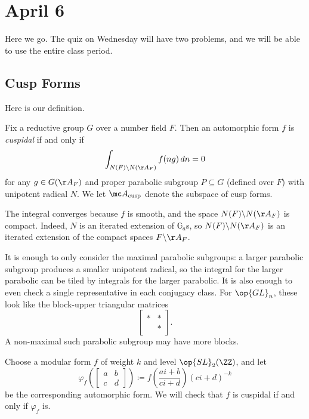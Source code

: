 \documentclass[../notes.tex]{subfiles}
\begin{document}
\section{April 6}
Here we go. The quiz on Wednesday will have two problems, and we will be able to use the entire class period.

\subsection{Cusp Forms}
Here is our definition.
\begin{definition}[cuspidal]
	Fix a reductive group $G$ over a number field $F$. Then an automorphic form $f$ is \textit{cuspidal} if and only if
	\[\int_{N(F)\backslash N(\AA_F)}f(ng)\,dn=0\]
	for any $g\in G(\AA_F)$ and proper parabolic subgroup $P\subseteq G$ (defined over $F$) with unipotent radical $N$. We let $\mc A_{\mathrm{cusp}}$ denote the subspace of cusp forms.
\end{definition}
\begin{remark}
	The integral converges because $f$ is smooth, and the space $N(F)\backslash N(\AA_F)$ is compact. Indeed, $N$ is an iterated extension of $\mathbb G_a$s, so $N(F)\backslash N(\AA_F)$ is an iterated extension of the compact spaces $F\backslash\AA_F$.
\end{remark}
\begin{remark}
	It is enough to only consider the maximal parabolic subgroups: a larger parabolic subgroup produces a smaller unipotent radical, so the integral for the larger parabolic can be tiled by integrals for the larger parabolic. It is also enough to even check a single representative in each conjugacy class. For $\op{GL}_n$, these look like the block-upper triangular matrices
	\[\begin{bmatrix}
		* & * \\ & *
	\end{bmatrix}.\]
	A non-maximal such parabolic subgroup may have more blocks.
\end{remark}
\begin{exe}
	Choose a modular form $f$ of weight $k$ and level $\op{SL}_2(\ZZ)$, and let
	\[\varphi_f\left(\begin{bmatrix}
		a & b \\ c  & d
	\end{bmatrix}\right)\coloneqq f\left(\frac{ai+b}{ci+d}\right)(ci+d)^{-k}\]
	be the corresponding automorphic form. We will check that $f$ is cuspidal if and only if $\varphi_f$ is.
\end{exe}
\end{document}

